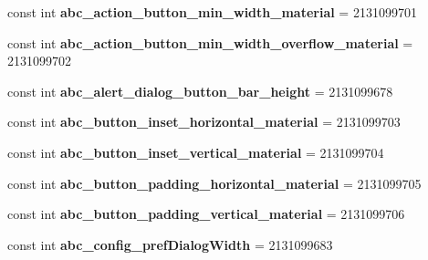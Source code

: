 \begin{DoxyCompactItemize}
\item 
\hypertarget{classClient_1_1Droid_1_1Resource_1_1Dimension_a5bb34a5a5902102e087747e7d8b4ebce}{}const int {\bfseries abc\+\_\+action\+\_\+button\+\_\+min\+\_\+width\+\_\+material} = 2131099701\label{classClient_1_1Droid_1_1Resource_1_1Dimension_a5bb34a5a5902102e087747e7d8b4ebce}

\item 
\hypertarget{classClient_1_1Droid_1_1Resource_1_1Dimension_a39166d775b1538263abc277de50a5234}{}const int {\bfseries abc\+\_\+action\+\_\+button\+\_\+min\+\_\+width\+\_\+overflow\+\_\+material} = 2131099702\label{classClient_1_1Droid_1_1Resource_1_1Dimension_a39166d775b1538263abc277de50a5234}

\item 
\hypertarget{classClient_1_1Droid_1_1Resource_1_1Dimension_a2f5a5e9e4fcc7a6cd8ab014a2d199178}{}const int {\bfseries abc\+\_\+alert\+\_\+dialog\+\_\+button\+\_\+bar\+\_\+height} = 2131099678\label{classClient_1_1Droid_1_1Resource_1_1Dimension_a2f5a5e9e4fcc7a6cd8ab014a2d199178}

\item 
\hypertarget{classClient_1_1Droid_1_1Resource_1_1Dimension_a5d22c715754a0392a6819fa595bc9460}{}const int {\bfseries abc\+\_\+button\+\_\+inset\+\_\+horizontal\+\_\+material} = 2131099703\label{classClient_1_1Droid_1_1Resource_1_1Dimension_a5d22c715754a0392a6819fa595bc9460}

\item 
\hypertarget{classClient_1_1Droid_1_1Resource_1_1Dimension_a26fed17a41c3ff47c72ea695c6a3b451}{}const int {\bfseries abc\+\_\+button\+\_\+inset\+\_\+vertical\+\_\+material} = 2131099704\label{classClient_1_1Droid_1_1Resource_1_1Dimension_a26fed17a41c3ff47c72ea695c6a3b451}

\item 
\hypertarget{classClient_1_1Droid_1_1Resource_1_1Dimension_afd18ac74fb46217eae3eb8d046ffaf4e}{}const int {\bfseries abc\+\_\+button\+\_\+padding\+\_\+horizontal\+\_\+material} = 2131099705\label{classClient_1_1Droid_1_1Resource_1_1Dimension_afd18ac74fb46217eae3eb8d046ffaf4e}

\item 
\hypertarget{classClient_1_1Droid_1_1Resource_1_1Dimension_aee3b3046686c582cd36cf93cca215640}{}const int {\bfseries abc\+\_\+button\+\_\+padding\+\_\+vertical\+\_\+material} = 2131099706\label{classClient_1_1Droid_1_1Resource_1_1Dimension_aee3b3046686c582cd36cf93cca215640}

\item 
\hypertarget{classClient_1_1Droid_1_1Resource_1_1Dimension_a3f3fa6c184a0a331d09b46096f53cde5}{}const int {\bfseries abc\+\_\+config\+\_\+pref\+Dialog\+Width} = 2131099683\label{classClient_1_1Droid_1_1Resource_1_1Dimension_a3f3fa6c184a0a331d09b46096f53cde5}


\end{DoxyCompactItemize}
